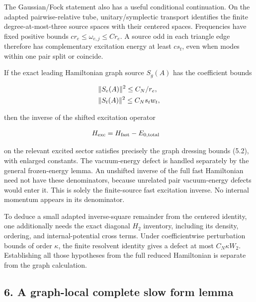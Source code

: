 The Gaussian/Fock statement also has a useful conditional continuation.
On the adapted pairwise-relative tube, unitary/symplectic transport
identifies the finite degree-at-most-three source spaces with their
centered spaces. Frequencies have fixed positive bounds
\(c r_{e} \le  \omega _{e,j} \le  C r_{e}\). A source odd in each
triangle edge therefore has complementary excitation energy at least
\(c s_{t}\), even when modes within one pair split or coincide.

If the exact leading Hamiltonian graph source \(S_{g}(A)\) has the
coefficient bounds

\begin{gather*}
\begin{aligned}
& \Vert S_{e}(A)\Vert ^{2} \le  C_{N}/r_{e}, \\
& \Vert S_{t}(A)\Vert ^{2} \le  C_{N} s_{t} w_{t},
\end{aligned}\notag
\end{gather*}

then the inverse of the shifted excitation operator

\begin{gather*}
\begin{aligned}
& H_{\mathrm{exc}} = H_{\mathrm{fast}} - E_{0,\mathrm{total}}
\end{aligned}\notag
\end{gather*}

on the relevant excited sector satisfies precisely the graph dressing
bounds (5.2), with enlarged constants. The vacuum-energy defect is
handled separately by the general frozen-energy lemma. An unshifted
inverse of the full fast Hamiltonian need not have these denominators,
because unrelated pair vacuum-energy defects would enter it. This is
solely the finite-source fast excitation inverse. No internal momentum
appears in its denominator.

To deduce a small adapted inverse-square remainder from the centered
identity, one additionally needs the exact diagonal \(H_{2}\) inventory,
including its density, ordering, and internal-potential cross terms.
Under coefficientwise perturbation bounds of order \(\kappa\), the
finite resolvent identity gives a defect at most
\(C_{N} \kappa  W_{2}\). Establishing all those hypotheses from the full
reduced Hamiltonian is separate from the graph calculation.

\subsection{6. A graph-local complete slow form
lemma}\label{c-a-graph-local-complete-slow-form-lemma}

